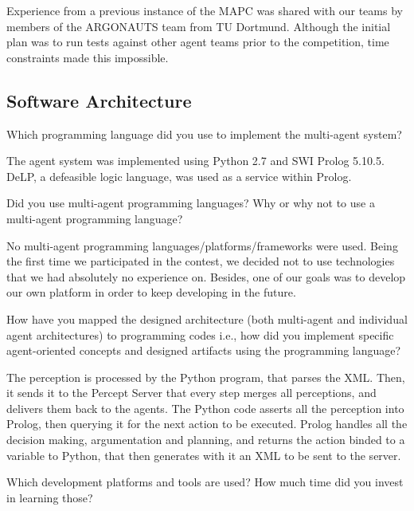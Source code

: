 Experience from a previous instance of the MAPC was shared with our
teams by members of the ARGONAUTS team from TU Dortmund\cite{Holzgen:2011}. Although the
initial plan was to run tests against other agent teams prior to the
competition, time constraints made this impossible.

\subsection{Software Architecture}
\setcounter{question}{0}
\begin{question}
Which programming language did you use to
implement the multi-agent system?  
\end{question}

The agent system was implemented using
Python 2.7 and SWI Prolog 5.10.5. DeLP, a defeasible logic language, was used
as a service within Prolog.

\begin{question}
Did you use multi-agent programming languages? Why or why not to use a
multi-agent programming language?  
\end{question}

No multi-agent programming
languages/platforms/frameworks were used. Being the first time we participated
in the contest, we decided not to use technologies that we had absolutely no experience on. Besides,
one of our goals was to develop our own platform in order to keep developing in the future.

\begin{question}
How have you mapped the designed architecture (both multi-agent and
individual agent architectures) to programming codes i.e., how did you
implement specific agent-oriented concepts and designed artifacts using the
programming language?  
\end{question}

The perception is processed by the Python program, that
parses the XML. Then, it sends it to the Percept Server that every step merges
all perceptions, and delivers them back to the agents.  The Python code
asserts all the perception into Prolog, then querying it for the next action
to be executed.  Prolog handles all the decision making, argumentation and
planning, and returns the action binded to a variable to Python, that then
generates with it an XML to be sent to the server.

\begin{question}
Which development platforms and tools are used? How much time did you
invest in learning those?  
\end{question}

